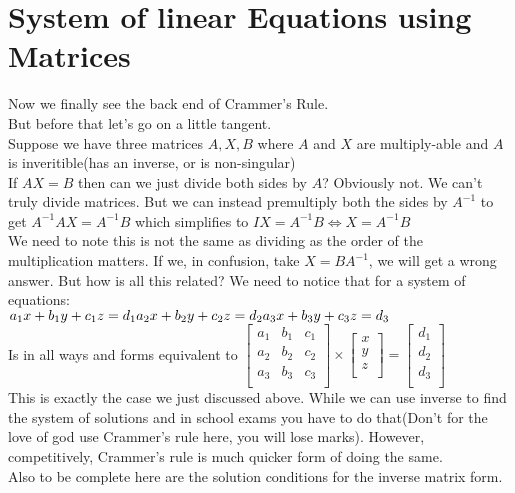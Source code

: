 \section{System of linear Equations using Matrices}
Now we finally see the back end of Crammer's Rule.\\
But before that let's go on a little tangent.\\
Suppose we have three matrices $A,X,B$ where $A$ and $X$ are multiply-able and $A$ is inveritible(has an inverse, or is non-singular)\\
If $AX=B$ then can we just divide both sides by $A$? Obviously not. We can't truly divide matrices. But we can instead premultiply both the sides by $A^{-1}$ to get $A^{-1}AX=A^{-1}B$ which simplifies to $IX=A^{-1}B \iff X=A^{-1}B$\\
We need to note this is not the same as dividing as the order of the multiplication matters. If we, in confusion, take $X=BA^{-1}$, we will get a wrong answer. But how is all this related?
We need to notice that for a system of equations:\\
$a_1x+b_1y+c_1z=d_1\\
a_2x+b_2y+c_2z=d_2\\
a_3x+b_3y+c_3z=d_3$\\
Is in all ways and forms equivalent to $\begin{bmatrix}
    a_1 & b_1 & c_1\\
    a_2 & b_2 & c_2\\
    a_3 & b_3 & c_3\\
\end{bmatrix} \times \begin{bmatrix}
    x\\
    y\\
    z\\
\end{bmatrix} = \begin{bmatrix}
    d_1\\
    d_2\\
    d_3\\
\end{bmatrix}$\\
This is exactly the case we just discussed above. While we can use inverse to find the system of solutions and in school exams you have to do that(Don't for the love of god use Crammer's rule here, you will lose marks). However, competitively, Crammer's rule is much quicker form of doing the same.\\
Also to be complete here are the solution conditions for the inverse matrix form.\\
